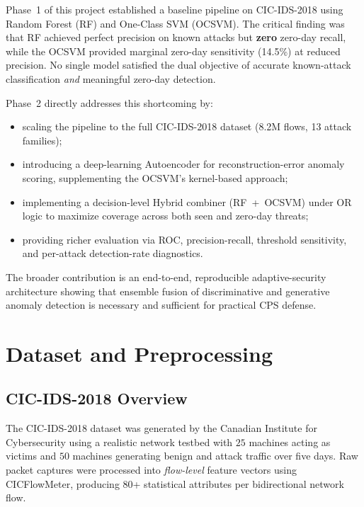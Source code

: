 \documentclass[10pt,conference]{IEEEtran}
\begin{document}
Phase~1 of this project established a baseline pipeline on CIC-IDS-2018
\cite{sharafaldin2018} using Random Forest (RF) and One-Class SVM (OCSVM).
The critical finding was that RF achieved perfect precision on known attacks
but \textbf{zero} zero-day recall, while the OCSVM provided marginal
zero-day sensitivity (14.5\%) at reduced precision. No single model
satisfied the dual objective of accurate known-attack classification
\emph{and} meaningful zero-day detection.

Phase~2 directly addresses this shortcoming by:
\begin{itemize}[leftmargin=*,noitemsep]
  \item scaling the pipeline to the full CIC-IDS-2018 dataset (8.2M flows,
        13 attack families);
  \item introducing a deep-learning Autoencoder for reconstruction-error
        anomaly scoring, supplementing the OCSVM's kernel-based approach;
  \item implementing a decision-level Hybrid combiner (RF~+~OCSVM) under
        OR logic to maximize coverage across both seen and zero-day threats;
  \item providing richer evaluation via ROC, precision-recall, threshold
        sensitivity, and per-attack detection-rate diagnostics.
\end{itemize}

The broader contribution is an end-to-end, reproducible adaptive-security
architecture showing that ensemble fusion of discriminative and generative
anomaly detection is necessary and sufficient for practical CPS defense.

\section{Dataset and Preprocessing}
\label{sec:dataset}

\subsection{CIC-IDS-2018 Overview}

The CIC-IDS-2018 dataset \cite{sharafaldin2018} was generated by the
Canadian Institute for Cybersecurity using a realistic network testbed
with $25$ machines acting as victims and $50$ machines generating benign
and attack traffic over five days. Raw packet captures were processed
into \emph{flow-level} feature vectors using CICFlowMeter, producing
80+ statistical attributes per bidirectional network flow.
\end{document}
